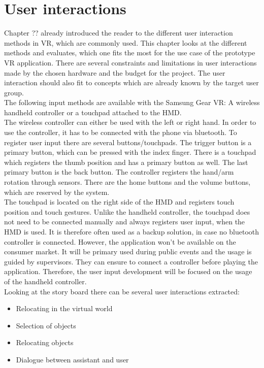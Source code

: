 \section{User interactions}

Chapter ?? already introduced the reader to the different user interaction methods in VR, which are commonly used. This chapter looks at the different methods and evaluates, which one fits the most for the use case of the prototype VR application. There are several constraints and limitations in user interactions made by the chosen hardware and the budget for the project. The user interaction should also fit to concepts which are already known by the target user group.\\
The following input methods are available with the Samsung Gear VR: A wireless handheld controller or a touchpad attached to the HMD. \\
The wireless controller can either be used with the left or right hand. In order to use the controller, it has to be connected with the phone via bluetooth. To register user input there are several buttons/touchpads. The trigger button is a primary button, which can be pressed with the index finger. There is a touchpad which registers the thumb position and has a primary button as well. The last primary button is the back  button. The controller registers the hand/arm rotation through sensors. There are the home buttons and the volume buttons, which are reserved by the system.\\
The touchpad is located on the right side of the HMD and registers touch position and touch gestures. Unlike the handheld controller, the touchpad does not need to be connected manually and always registers user input, when the HMD is used. It is therefore often used as a backup solution, in case no bluetooth controller is connected. However, the application won't be available on the consumer market. It will be primary used during public events and the usage is guided by supervisors. They can ensure to connect a controller before playing the application. Therefore, the user input development will be focused on the usage of the handheld controller.\\
Looking at the story board there can be several user interactions extracted:
\begin{itemize}
\item Relocating in the virtual world
\item Selection of objects
\item Relocating objects
\item Dialogue between assistant and user
\end{itemize}
